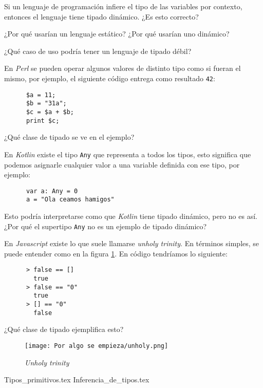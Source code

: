   \begin{exercise}
    Si un lenguaje de programación infiere el tipo de las variables por contexto, entonces el 
    lenguaje tiene tipado dinámico.
    ¿Es esto correcto?
  \end{exercise}

  \begin{exercise}
    ¿Por qué usarían un lenguaje estático?
    ¿Por qué usarían uno dinámico?
  \end{exercise}

  \begin{exercise}
    ¿Qué caso de uso podría tener un lenguaje de tipado débil?
  \end{exercise}

  \begin{exercise}
    En \textit{Perl} se pueden operar algunos valores de distinto tipo como si fueran el mismo,
    por ejemplo, el siguiente código entrega como resultado \texttt{42}:
    \begin{verbatim}
      $a = 11;
      $b = "31a";
      $c = $a + $b;
      print $c;
    \end{verbatim}

    ¿Qué clase de tipado se ve en el ejemplo?
  \end{exercise}
  
  \begin{exercise}
    En \textit{Kotlin} existe el tipo \texttt{Any} que representa a todos los tipos, 
    esto significa que podemos asignarle cualquier valor a una variable definida con ese tipo, por
    ejemplo:

    \begin{verbatim}
      var a: Any = 0
      a = "Ola ceamos hamigos"
    \end{verbatim}

    Esto podría interpretarse como que \textit{Kotlin} tiene tipado dinámico, pero no es así.
    ¿Por qué el supertipo \texttt{Any} no es un ejemplo de tipado dinámico?
  \end{exercise}

  \begin{exercise}
    En \textit{Javascript} existe lo que suele llamarse \textit{unholy trinity}.
    En términos simples, se puede entender como en la figura \ref{fig:unholy}.
    En código tendríamos lo siguiente:
    \begin{verbatim}
      > false == [] 
        true
      > false == "0"
        true
      > [] == "0"
        false
    \end{verbatim}

    ¿Qué clase de tipado ejemplifica esto?
  \end{exercise}

  \begin{figure}[ht!]
    \centering
    \texttt{[image: Por algo se empieza/unholy.png]}
    \caption{\textit{Unholy trinity}}
    \label{fig:unholy}
  \end{figure}

  {Tipos_primitivos.tex}
  {Inferencia_de_tipos.tex}